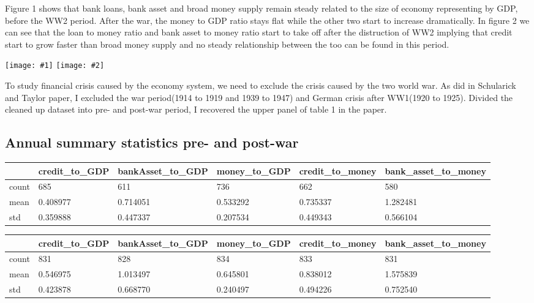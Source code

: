 \documentclass{article}
\newcommand{\ciapdf}[1]{\resizebox{\textwidth}{!}{\texttt{[image: \#1]}}}
\newcommand{\halfhalf}[2]{\begin{multicols}{2}\texttt{[image: \#1]} \texttt{[image: \#2]}\end{multicols}}
\begin{document}
Figure 1 shows that bank loans, bank asset and broad money supply remain
steady related to the size of economy representing by GDP,
before the WW2 period. After the war, the money to GDP ratio stays flat
while the other two start to increase dramatically. In figure 2 we
can see that the loan to money ratio and bank asset to money ratio start
to take off after the distruction of WW2 implying that credit start to
grow faster than broad money supply and no steady relationship between
the too can be found in this period.

\ciapdf{Figure_1.pdf}

\ciapdf{Figure_2.pdf}

\halfhalf{Figure_1.pdf}{Figure_2.pdf}

To study financial crisis caused by the economy system, we need to
exclude the crisis caused by the two world war. As did in Schularick and
Taylor paper, I excluded the war period(1914 to 1919 and 1939 to 1947)
and German crisis after WW1(1920 to 1925). Divided the cleaned up
dataset into pre- and post-war period, I recovered the upper panel of
table 1 in the paper.

\subsection*{Annual summary statistics pre- and post-war}

\begin{table}[H]
    \begin{tabular}{|l|l|l|l|l|l|}
    \hline
          & credit\_to\_GDP & bankAsset\_to\_GDP & money\_to\_GDP & credit\_to\_money & bank\_asset\_to\_money \\ \hline
    count & 685             & 611                & 736            & 662               & 580                    \\ \hline
    mean  & 0.408977        & 0.714051           & 0.533292       & 0.735337          & 1.282481               \\ \hline
    std   & 0.359888        & 0.447337           & 0.207534       & 0.449343          & 0.566104               \\ \hline
    \end{tabular}
\end{table}

\begin{table}[H]
    \begin{tabular}{|l|l|l|l|l|l|}
    \hline
          & credit\_to\_GDP & bankAsset\_to\_GDP & money\_to\_GDP & credit\_to\_money & bank\_asset\_to\_money \\ \hline
    count & 831             & 828                & 834            & 833               & 831                    \\ \hline
    mean  & 0.546975        & 1.013497           & 0.645801       & 0.838012          & 1.575839               \\ \hline
    std   & 0.423878        & 0.668770           & 0.240497       & 0.494226          & 0.752540               \\ \hline
    \end{tabular}
\end{table}
\end{document}

